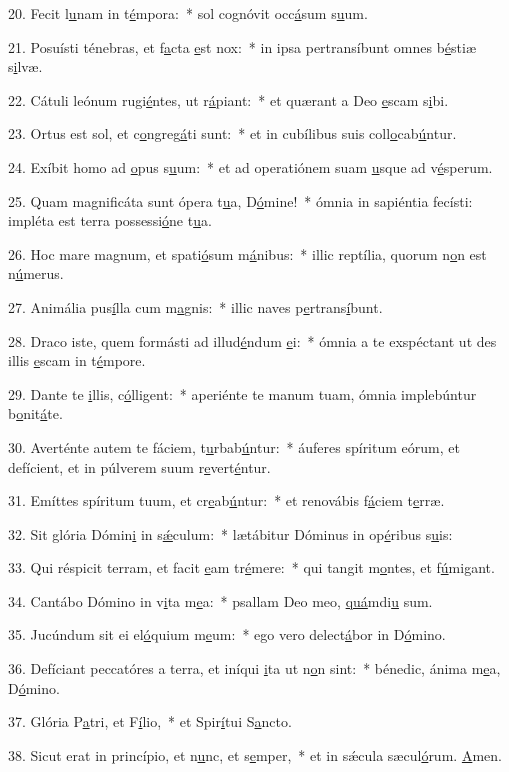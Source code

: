 20. Fecit l\uline{u}nam in t\uline{é}mpora:~* sol cognóvit occ\uline{á}sum s\uline{u}um.\par 
21. Posuísti ténebras, et f\uline{a}cta \uline{e}st nox:~* in ipsa pertransíbunt omnes b\uline{é}stiæ s\uline{i}lvæ.\par 
22. Cátuli leónum rugi\uline{é}ntes, ut r\uline{á}piant:~* et quærant a Deo \uline{e}scam s\uline{i}bi.\par 
23. Ortus est sol, et c\uline{o}ngreg\uline{á}ti sunt:~* et in cubílibus suis coll\uline{o}cab\uline{ú}ntur.\par 
24. Exíbit homo ad \uline{o}pus s\uline{u}um:~* et ad operatiónem suam \uline{u}sque ad v\uline{é}sperum.\par 
25. Quam magnificáta sunt ópera t\uline{u}a, D\uline{ó}mine!~* ómnia in sapiéntia fecísti: impléta est terra possessi\uline{ó}ne t\uline{u}a.\par 
26. Hoc mare magnum, et spati\uline{ó}sum m\uline{á}nibus:~* illic reptília, quorum n\uline{o}n est n\uline{ú}merus.\par 
27. Animália pus\uline{í}lla cum m\uline{a}gnis:~* illic naves p\uline{e}rtrans\uline{í}bunt.\par 
28. Draco iste, quem formásti ad illud\uline{é}ndum \uline{e}i:~* ómnia a te exspéctant ut des illis \uline{e}scam in t\uline{é}mpore.\par 
29. Dante te \uline{i}llis, c\uline{ó}lligent:~* aperiénte te manum tuam, ómnia implebúntur b\uline{o}nit\uline{á}te.\par 
30. Averténte autem te fáciem, t\uline{u}rbab\uline{ú}ntur:~* áuferes spíritum eórum, et defícient, et in púlverem suum r\uline{e}vert\uline{é}ntur.\par 
31. Emíttes spíritum tuum, et cr\uline{e}ab\uline{ú}ntur:~* et renovábis f\uline{á}ciem t\uline{e}rræ.\par 
32. Sit glória Dómin\uline{i} in s\uline{ǽ}culum:~* lætábitur Dóminus in op\uline{é}ribus s\uline{u}is:\par 
33. Qui réspicit terram, et facit \uline{e}am tr\uline{é}mere:~* qui tangit m\uline{o}ntes, et f\uline{ú}migant.\par 
34. Cantábo Dómino in v\uline{i}ta m\uline{e}a:~* psallam Deo meo, \uline{quá}mdi\uline{u} sum.\par 
35. Jucúndum sit ei el\uline{ó}quium m\uline{e}um:~* ego vero delect\uline{á}bor in D\uline{ó}mino.\par 
36. Defíciant peccatóres a terra, et iníqui \uline{i}ta ut n\uline{o}n sint:~* bénedic, ánima m\uline{e}a, D\uline{ó}mino.\par 
37. Glória P\uline{a}tri, et F\uline{í}lio,~* et Spir\uline{í}tui S\uline{a}ncto.\par 
38. Sicut erat in princípio, et n\uline{u}nc, et s\uline{e}mper,~* et in sǽcula sæcul\uline{ó}rum. \uline{A}men.\par 
